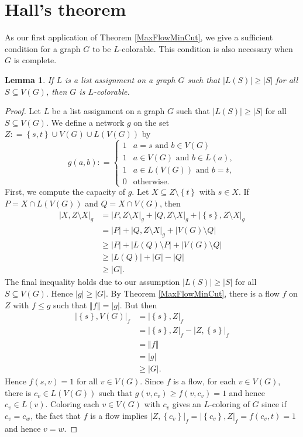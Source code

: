 \documentclass[openany]{tufte-book} %
\theoremstyle{plain}
\newtheorem{lemma}{Lemma}
\newcommand{\set}[1]{\left\{ #1 \right\}}
\newcommand{\card}[1]{\left|#1\right|}
\newcommand{\size}[1]{\left\Vert#1\right\Vert}
\newcommand{\DefinedAs}{\mathrel{\mathop:}=}
\begin{document}
\section{Hall's theorem}
As our first application of Theorem \ref{MaxFlowMinCut}, we give a sufficient condition for a graph $G$ to be $L$-colorable.  This 
condition is also necessary when $G$ is complete.
\begin{lemma}\label{HallTheoremLemma}
If $L$ is a list assignment on a graph $G$ such that $\card{L(S)} \ge \card{S}$ for all $S \subseteq V(G)$, then $G$ is $L$-colorable.
\end{lemma}
\begin{proof}
Let $L$ be a list assignment on a graph $G$ such that $\card{L(S)} \ge \card{S}$ for all $S \subseteq V(G)$.  
We define a network $g$ on the set $Z \DefinedAs \set{s,t} \cup V(G) \cup L(V(G))$ by
\[g(a, b) \DefinedAs  \begin{cases} 
      1 & a = s \text{ and } b \in  V(G)\\
	  1 & a \in V(G) \text{ and } b \in L(a),\\
      1 & a \in L(V(G)) \text{ and } b=t,\\
      0 & \text{otherwise} .
   \end{cases}
\]
First, we compute the capacity of $g$. Let $X \subseteq Z \setminus \set{t}$ with $s \in X$.  If $P = X \cap L(V(G))$ and $Q = X \cap V(G)$, then
\begin{align*}
\card{X, Z\setminus X}_g &= \card{P, Z\setminus X}_g + \card{Q, Z\setminus X}_g + \card{\set{s}, Z\setminus X}_g\\
&=\card{P} + \card{Q, Z\setminus X}_g + \card{V(G)\setminus Q}\\
&\ge\card{P} + \card{L(Q) \setminus P} + \card{V(G)\setminus Q}\\
&\ge\card{L(Q)} + \card{G} - \card{Q}\\
&\ge \card{G}.
\end{align*}
The final inequality holds due to our assumption $\card{L(S)} \ge \card{S}$ for all $S \subseteq V(G)$. 
Hence $\card{g} \ge \card{G}$.  By Theorem \ref{MaxFlowMinCut}, there is a flow $f$ on $Z$ with $f \le g$ such that $\size{f} = \card{g}$.  But then
\begin{align*}
\card{\set{s}, V(G)}_f &=  \card{\set{s}, Z}_f \\
&= \card{\set{s}, Z}_f - \card{Z, \set{s}}_f\\
&=\size{f}\\
&= \card{g}\\
&\ge\card{G}.
\end{align*}
Hence $f(s,v) = 1$ for all $v \in V(G)$.  Since $f$ is a flow, for each $v \in V(G)$, there is $c_v \in L(V(G))$ such that $g(v, c_v) \ge f(v, c_v) = 1$ and hence $c_v \in L(v)$.
Coloring each $v \in V(G)$ with $c_v$ gives an $L$-coloring of $G$ since if $c_v = c_w$, the fact that $f$ is a flow implies 
$\card{Z, \set{c_v}}_f = \card{\set{c_v}, Z}_f = f(c_v, t) = 1$ and hence $v = w$.
\end{proof}
\end{document}
